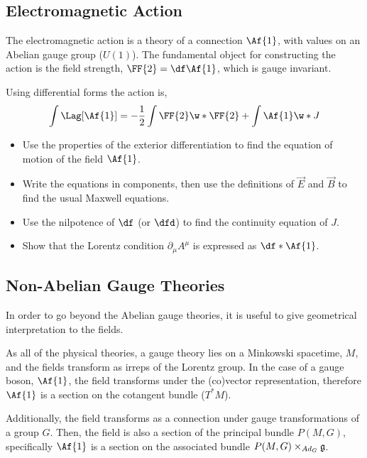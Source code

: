 \subsection{Electromagnetic Action}

The electromagnetic action is a theory of a connection $\Af{1}$, with values on an Abelian gauge group ($U(1)$). The fundamental object for constructing the action is the field strength, $\FF{2}=\df\Af{1}$, which is gauge invariant.

Using differential forms the action is,
\begin{align}
  \int\Lag[\Af{1}] = -\frac{1}{2}\int \FF{2}\w *\FF{2}+\int \Af{1}\w*J
\end{align}


\begin{Ebox}
  \begin{itemize}
  \item Use the properties of the exterior differentiation to find the equation of motion of the field $\Af{1}$.
  \item Write the equations in components, then use the definitions of $\vec{E}$ and $\vec{B}$ to find the usual Maxwell equations.
  \item Use the nilpotence of $\df$ (or $\dfd$) to find the continuity equation of $J$.
  \item Show that the Lorentz condition $\partial_\mu A^\mu$ is expressed as $\df*\Af{1}$.
  \end{itemize}
\end{Ebox}
     


\subsection{Non-Abelian Gauge Theories}

In order to go beyond the Abelian gauge theories, it is useful to give geometrical interpretation to the fields.

As all of the physical theories, a gauge theory lies on a Minkowski spacetime, $M$, and the fields transform as irreps of the Lorentz group. In the case of a gauge boson,  $\Af{1}$, the field transforms under the (co)vector representation, therefore $\Af{1}$ is a section on the cotangent bundle ($T^*M$).

Additionally, the field transforms as a connection under gauge transformations of a group $G$. Then, the field is also a section of the principal bundle $P(M,G)$, specifically $\Af{1}$ is a section on the associated bundle $P(M,G)\times_{Ad_G}\frak{g}$.

